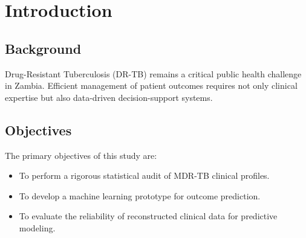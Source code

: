 \chapter{Introduction}
\section{Background}
Drug-Resistant Tuberculosis (DR-TB) remains a critical public health challenge in Zambia. Efficient management of patient outcomes requires not only clinical expertise but also data-driven decision-support systems.

\section{Objectives}
The primary objectives of this study are:
\begin{itemize}
    \item To perform a rigorous statistical audit of MDR-TB clinical profiles.
    \item To develop a machine learning prototype for outcome prediction.
    \item To evaluate the reliability of reconstructed clinical data for predictive modeling.
\end{itemize}

